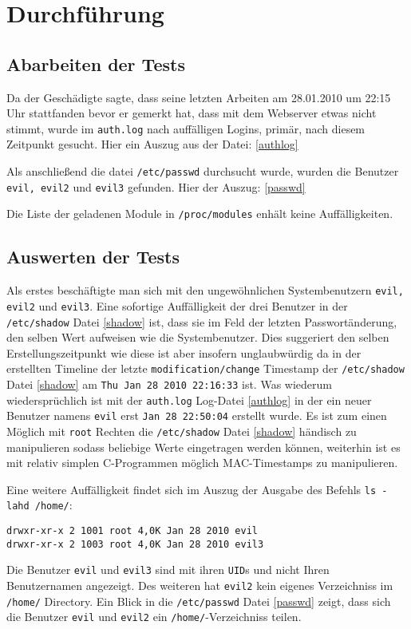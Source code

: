 \section{Durchführung}
\subsection{Abarbeiten der Tests}
Da der Geschädigte sagte, dass seine letzten Arbeiten am 28.01.2010 um 22:15 Uhr stattfanden bevor er gemerkt hat, dass mit dem Webserver etwas nicht stimmt, wurde im \texttt{auth.log} nach auffälligen Logins, primär, nach diesem Zeitpunkt gesucht.
Hier ein Auszug aus der Datei: \ref{authlog}
\lstset{basicstyle=\footnotesize, breaklines=true, breakatwhitespace=true}


Als anschließend die datei \texttt{/etc/passwd} durchsucht wurde, wurden die Benutzer \texttt{evil, evil2} und \texttt{evil3} gefunden. Hier der Auszug: \ref{passwd}
\lstset{basicstyle=\footnotesize, breaklines=true, breakatwhitespace=true}



Die Liste der geladenen Module in \texttt{/proc/modules} enhält keine Auffälligkeiten.
\pagebreak
\subsection{Auswerten der Tests}
Als erstes beschäftigte man sich mit den ungewöhnlichen Systembenutzern \texttt{evil, evil2} und \texttt{evil3}. Eine sofortige Auffälligkeit der drei Benutzer in der \texttt{/etc/shadow} Datei \ref{shadow} ist, dass sie im Feld der letzten Passwortänderung, den selben Wert aufweisen wie die Systembenutzer. Dies suggeriert den selben Erstellungszeitpunkt wie diese ist aber insofern unglaubwürdig da in der erstellten Timeline der letzte \texttt{modification/change} Timestamp der \texttt{/etc/shadow} Datei \ref{shadow} am \texttt{Thu Jan 28 2010 22:16:33} ist. Was wiederum wiedersprüchlich ist mit der \texttt{auth.log} Log-Datei \ref{authlog} in der ein neuer Benutzer namens \texttt{evil} erst \texttt{Jan 28 22:50:04} erstellt wurde. Es ist zum einen Möglich mit \texttt{root} Rechten die \texttt{/etc/shadow} Datei \ref{shadow} händisch zu manipulieren sodass beliebige Werte eingetragen werden können, weiterhin ist es mit relativ simplen C-Programmen möglich MAC-Timestamps zu manipulieren.

Eine weitere Auffälligkeit findet sich im Auszug der Ausgabe des Befehls \texttt{ls -lahd /home/}:
\begin{verbatim}
drwxr-xr-x 2 1001 root 4,0K Jan 28 2010 evil
drwxr-xr-x 2 1003 root 4,0K Jan 28 2010 evil3
\end{verbatim}
Die Benutzer \texttt{evil} und \texttt{evil3} sind mit ihren \texttt{UID}s und nicht Ihren Benutzernamen angezeigt. Des weiteren hat \texttt{evil2} kein eigenes Verzeichniss im \texttt{/home/} Directory. Ein Blick in die \texttt{/etc/passwd} Datei \ref{passwd} zeigt, dass sich die Benutzer \texttt{evil} und \texttt{evil2} ein \texttt{/home/}-Verzeichniss teilen.
\lstset{basicstyle=\footnotesize, breaklines=true, breakatwhitespace=true}


